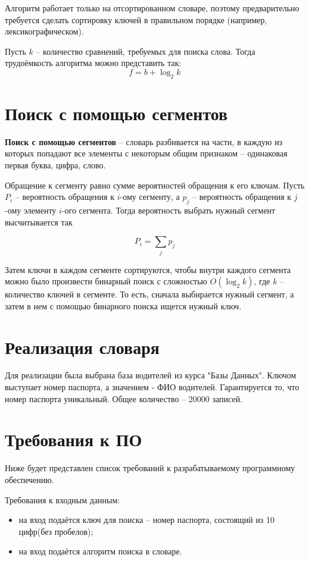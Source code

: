 Алгоритм работает только на отсортированном словаре, поэтому предварительно требуется сделать сортировку ключей в правильном порядке
(например, лексикографическом).

Пусть $k$ -- количество сравнений, требуемых для поиска слова. Тогда трудоёмкость алгоритма можно представить так:
\begin{equation}
f = b + \log_2 k
\end{equation}

\section{Поиск с помощью сегментов}

\textbf{Поиск с помощью сегментов} \cite{search-segments} -- словарь разбивается на части, в каждую из которых попадают все элементы с некоторым общим признаком -- одинаковая первая буква, цифра, слово.

Обращение к сегменту равно сумме вероятностей обращения к его ключам. Пусть $P_i$ -- вероятность обращения к $i$-ому сегменту, а $p_j$ -- вероятность обращения к $j$-ому элементу $i$-ого сегмента. Тогда вероятность выбрать нужный сегмент высчитывается так 

\begin{equation}
P_i = \sum_j p_j
\end{equation}

Затем ключи в каждом сегменте сортируются, чтобы внутри каждого сегмента можно было произвести бинарный поиск с сложностью $O(\log_2 k)$, где $k$ -- количество ключей в сегменте.
То есть, сначала выбирается нужный сегмент, а затем в нем с помощью бинарного поиска ищется нужный ключ.

\section{Реализация словаря}
Для реализации была выбрана база водителей из курса "Базы Данных". 
Ключом выступает номер паспорта, а значением - ФИО водителей. 
Гарантируется то, что номер паспорта уникальный. 
Общее количество -- 20000 записей.

\section{Требования к ПО}
Ниже будет представлен список требований к разрабатываемому программному обеспечению. 

Требования к входным данным: 
\begin{itemize}
	\item на вход подаётся ключ для поиска -- номер паспорта, состоящий из 10 цифр(без пробелов);
	\item на вход подаётся алгоритм поиска в словаре.
\end{itemize}

